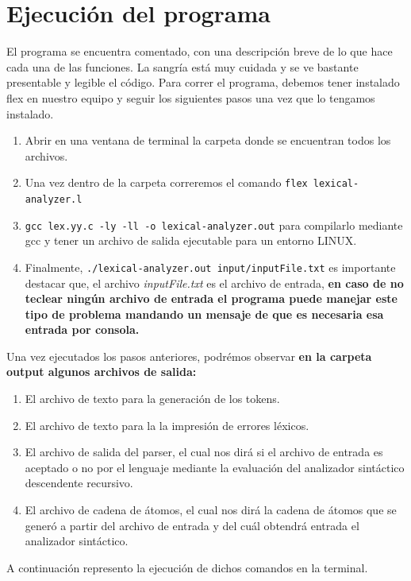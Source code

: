 \documentclass[12pt, a4paper]{article}
\begin{document}
\section{Ejecución del programa}
El programa se encuentra comentado, con una descripción breve de lo que hace cada una de las funciones. La sangría está muy cuidada y se ve bastante presentable y legible el código.
Para correr el programa, debemos tener instalado flex en nuestro equipo y seguir los siguientes pasos una vez que lo tengamos instalado.

\begin{enumerate}
    \item Abrir en una ventana de terminal la carpeta donde se encuentran todos los archivos.
    \item Una vez dentro de la carpeta correremos el comando \texttt{flex lexical-analyzer.l}
    \item \texttt{gcc lex.yy.c -ly -ll -o lexical-analyzer.out} para compilarlo mediante gcc y tener un archivo de salida ejecutable para un entorno LINUX.
    \item Finalmente, \texttt{./lexical-analyzer.out input/inputFile.txt} es importante destacar que, el archivo \textit{inputFile.txt} es el archivo de entrada, \textbf{en caso de no teclear ningún archivo de entrada el programa puede manejar este tipo de problema mandando un mensaje de que es necesaria esa entrada por consola.}
\end{enumerate}

Una vez ejecutados los pasos anteriores, podrémos observar \textbf{en la carpeta output algunos archivos de salida:}
\begin{enumerate}
    \item El archivo de texto para la generación de los tokens.
    \item El archivo de texto para la la impresión de errores léxicos.
    \item El archivo de salida del parser, el cual nos dirá si el archivo de entrada es aceptado o no por el lenguaje mediante la evaluación del analizador sintáctico descendente recursivo.
    \item El archivo de cadena de átomos, el cual nos dirá la cadena de átomos que se generó a partir del archivo de entrada y del cuál obtendrá entrada el analizador sintáctico.
\end{enumerate}

A continuación represento la ejecución de dichos comandos en la terminal.
\end{document}
